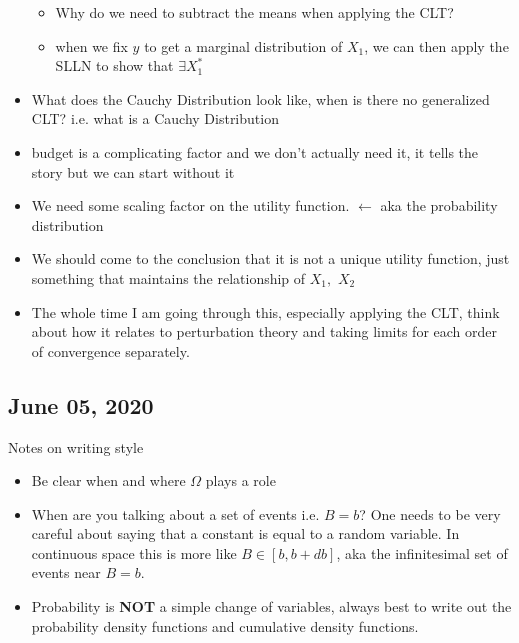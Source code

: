 \begin{itemize}
\begin{itemize}
		\item {Why do we need to subtract the means when applying the CLT?}
		\item when we fix $y$ to get a marginal distribution of $X_1$, we can then apply the SLLN to show that $\exists X_1^*$
	\end{itemize}
	\item {What does the Cauchy Distribution look like, when is there no generalized CLT?} i.e. what is a Cauchy Distribution
	\item {budget is a complicating factor and we don't actually need it}, it tells the story but we can start without it 
	\item {We need some scaling factor on the utility function.} $\leftarrow$ aka the probability distribution
	\item We should come to the conclusion that it is not a unique utility function, just something that maintains the relationship of $X_1,$ $X_2$
	\item {The whole time I am going through this, especially applying the CLT, think about how it relates to perturbation theory and taking limits for each order of convergence separately.}
\end{itemize}



\subsection{June 05, 2020}

Notes on writing style
\begin{itemize}
	\item Be clear when and where $\Omega$ plays a role
	\item When are you talking about a set of events i.e. $B=b$? One needs to be very careful about saying that a constant is equal to a random variable. In continuous space this is more like $B\in [b, b + db]$, aka the infinitesimal set of events near $B=b$.
	\item Probability is \textbf{NOT} a simple change of variables, always best to write out the probability density functions and cumulative density functions.
\end{itemize}

